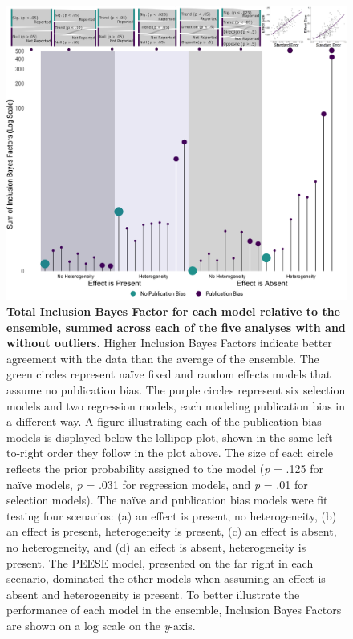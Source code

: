\documentclass[
  man, donotrepeattitle,floatsintext]{apa7}
\begin{document}
\begin{figure}

{\centering \includegraphics{../../figs/fig3} 

}

\caption{\linespread{1.15}\selectfont \small \normalfont \textbf{Total Inclusion Bayes Factor for each model relative to the ensemble, summed across each of the five analyses with and without outliers.} Higher Inclusion Bayes Factors indicate better agreement with the data than the average of the ensemble. The green circles represent naïve fixed and random effects models that assume no publication bias. The purple circles represent six selection models and two regression models, each modeling publication bias in a different way. A figure illustrating each of the publication bias models is displayed below the lollipop plot, shown in the same left-to-right order they follow in the plot above. The size of each circle reflects the prior probability assigned to the model (\emph{p} = .125 for naïve models, \emph{p} = .031 for regression models, and \emph{p} = .01 for selection models). The naïve and publication bias models were fit testing four scenarios: (a) an effect is present, no heterogeneity, (b) an effect is present, heterogeneity is present, (c) an effect is absent, no heterogeneity, and (d) an effect is absent, heterogeneity is present. The PEESE model, presented on the far right in each scenario, dominated the other models when assuming an effect is absent and heterogeneity is present. To better illustrate the performance of each model in the ensemble, Inclusion Bayes Factors are shown on a log scale on the \emph{y}-axis.}\label{fig:fig3}
\end{figure}
\end{document}
